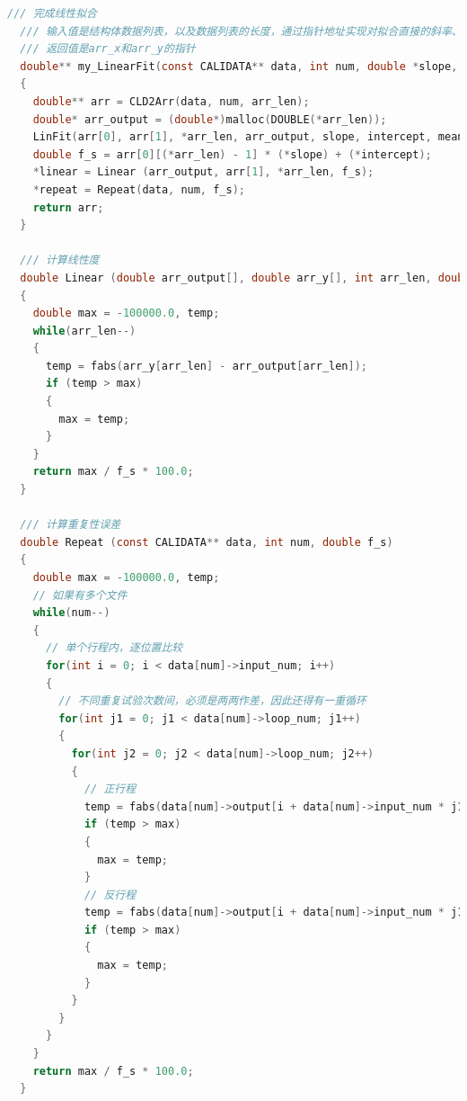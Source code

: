 \documentclass[a4paper,12pt,twoside]{article}%
\begin{document}
\begin{lstlisting}[language=C]
  /// 完成线性拟合
  /// 输入值是结构体数据列表，以及数据列表的长度，通过指针地址实现对拟合直接的斜率、截距、直线度和重复度误差的同时计算，并输出拼合后的double数据列表。
  /// 返回值是arr_x和arr_y的指针
  double** my_LinearFit(const CALIDATA** data, int num, double *slope, double *intercept, double *meanSquaredError, double *linear, double *repeat, int *arr_len)
  {
    double** arr = CLD2Arr(data, num, arr_len);
    double* arr_output = (double*)malloc(DOUBLE(*arr_len));
    LinFit(arr[0], arr[1], *arr_len, arr_output, slope, intercept, meanSquaredError);
    double f_s = arr[0][(*arr_len) - 1] * (*slope) + (*intercept);
    *linear = Linear (arr_output, arr[1], *arr_len, f_s);
    *repeat = Repeat(data, num, f_s);
    return arr;
  }
  
  /// 计算线性度
  double Linear (double arr_output[], double arr_y[], int arr_len, double f_s)
  {	
    double max = -100000.0, temp;
    while(arr_len--)
    {
      temp = fabs(arr_y[arr_len] - arr_output[arr_len]);
      if (temp > max)
      {
        max = temp;
      }
    }
    return max / f_s * 100.0;
  }
  
  /// 计算重复性误差
  double Repeat (const CALIDATA** data, int num, double f_s)
  {	
    double max = -100000.0, temp;
    // 如果有多个文件
    while(num--)
    {	
      // 单个行程内，逐位置比较
      for(int i = 0; i < data[num]->input_num; i++)
      {	
        // 不同重复试验次数间，必须是两两作差，因此还得有一重循环
        for(int j1 = 0; j1 < data[num]->loop_num; j1++)
        {	
          for(int j2 = 0; j2 < data[num]->loop_num; j2++)
          {
            // 正行程
            temp = fabs(data[num]->output[i + data[num]->input_num * j1 * 2] - data[num]->output[i + data[num]->input_num * j2 * 2]);
            if (temp > max)
            {
              max = temp;
            }
            // 反行程
            temp = fabs(data[num]->output[i + data[num]->input_num * j1 * 2 + 1] - data[num]->output[i + data[num]->input_num * j2 * 2 + 1]);
            if (temp > max)
            {
              max = temp;
            }
          }
        }
      }
    }
    return max / f_s * 100.0;
  }
\end{lstlisting}
\end{document}
